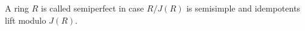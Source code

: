 A ring $R$ is called semiperfect in case $R/J(R)$ is semisimple and idempotents lift modulo $J(R)$.
